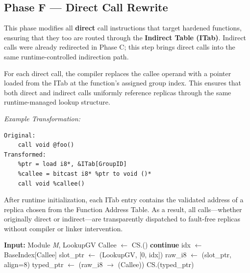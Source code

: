 \subsection*{Phase F — Direct Call Rewrite}
This phase modifies all \textbf{direct} call instructions that target hardened
functions, ensuring that they too are routed through the \textbf{Indirect Table
(ITab)}. Indirect calls were already redirected in Phase C; this step brings
direct calls into the same runtime-controlled indirection path.

For each direct call, the compiler replaces the callee operand with a pointer
loaded from the ITab at the function’s assigned group index. This ensures that
both direct and indirect calls uniformly reference replicas through the same
runtime-managed lookup structure.

\begin{center}
\textit{Example Transformation:}
\end{center}

\begin{verbatim}
Original:
    call void @foo()
Transformed:
    %ptr = load i8*, &ITab[GroupID]
    %callee = bitcast i8* %ptr to void ()*
    call void %callee()
\end{verbatim}

After runtime initialization, each ITab entry contains the validated address of
a replica chosen from the Function Address Table. As a result, all calls—whether
originally direct or indirect—are transparently dispatched to fault-free
replicas without compiler or linker intervention.

\begin{algorithm}[H]
\caption{Phase F — Rewrite Direct Calls via Lookup Table}
\label{alg:phaseF}
\begin{algorithmic}[1]
\State \textbf{Input:} Module \textit{M}, LookupGV
    \State Callee $\gets$ CS.()
     \State \textbf{continue} \EndIf
    \State idx $\gets$ BaseIndex[Callee]
    \State slot\_ptr $\gets$ (LookupGV, [0, idx]) 
    \State raw\_i8 $\gets$ (slot\_ptr, align=8)
    \State typed\_ptr $\gets$ (raw\_i8 $\rightarrow$ (Callee))
    \State CS.(typed\_ptr)
  \EndFor
\EndFor
\end{algorithmic}
\end{algorithm}
\clearpage

